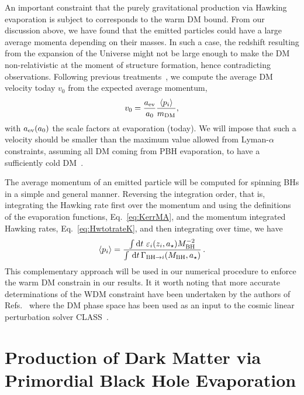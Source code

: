 \documentclass[aps,prd,reprint,twocolumn,preprintnumbers,floatfix,nofootinbib]{revtex4-1}
\newcommand{\MBH}{M_{\rm BH}}
\newcommand{\as}{a_\star}
\begin{document}
An important constraint that the purely gravitational production via Hawking evaporation is subject to corresponds to the warm DM bound. From our discussion above, we have found that the emitted particles could have a large average momenta depending on their masses. In such a case, the redshift resulting from the expansion of the Universe might not be large enough to make the DM non-relativistic at the moment of structure formation, hence contradicting observations. Following previous treatments~\cite{Baldes:2020nuv,Masina:2020xhk,Masina:2021zpu}, we compute the average DM velocity today $v_{0}$ from the expected average momentum,
\begin{align}
    v_{0}=\frac{a_{\rm ev}}{a_0}\frac{\langle p_i \rangle}{m_{\rm DM}},
    \label{eq:wdm}
\end{align}
with $a_{\rm ev}(a_0)$ the scale factors at evaporation (today). We will impose that such a velocity should be smaller than the maximum value allowed from Lyman-$\alpha$ constraints, assuming all DM coming from PBH evaporation, to have a sufficiently cold DM~\cite{Bode:2000gq,Boyarsky:2008xj,Baldes:2020nuv,Baur:2017stq}. 

The average momentum of an emitted particle will be computed for spinning BHs in a simple and general manner. Reversing the integration order, that is, integrating the Hawking rate first over the momentum and using the definitions of the evaporation functions, Eq.~\eqref{eq:KerrMA}, and the momentum integrated Hawking rates, Eq.~\eqref{eq:HwtotrateK}, and then integrating over time, we have
\begin{align}\label{eq:ave_mom}
    \langle p_i \rangle = \frac{\int \dd{t}\,\varepsilon_i(z_i,\as) \MBH^{-2}}{\int\, \dd{t}\Gamma_{{\rm BH} \to i}(\MBH,\as)}\,.
\end{align}
This complementary approach will be used in our numerical procedure to enforce the warm DM constrain in our results. It it worth noting that more accurate determinations of the WDM constraint have been undertaken by the authors of Refs.~\cite{Baldes:2020nuv, Auffinger:2020afu, Masina:2021zpu} where the DM phase space has been used as an input to the cosmic linear perturbation solver CLASS~\cite{CLASSI, CLASSII, CLASSIV}.

\section{Production of Dark Matter via Primordial Black Hole Evaporation}\label{sec:evaporation}
\end{document}
